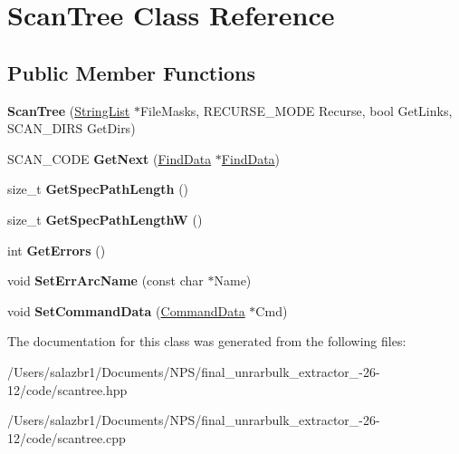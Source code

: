 \hypertarget{class_scan_tree}{\section{Scan\-Tree Class Reference}
\label{class_scan_tree}
}
\subsection*{Public Member Functions}
\begin{DoxyCompactItemize}
\item 
\hypertarget{class_scan_tree_ac0ce8c91db12e916d275bbc1b6ac73c2}{{\bfseries Scan\-Tree} (\hyperlink{class_string_list}{String\-List} $\ast$File\-Masks, R\-E\-C\-U\-R\-S\-E\-\_\-\-M\-O\-D\-E Recurse, bool Get\-Links, S\-C\-A\-N\-\_\-\-D\-I\-R\-S Get\-Dirs)}\label{class_scan_tree_ac0ce8c91db12e916d275bbc1b6ac73c2}

\item 
\hypertarget{class_scan_tree_a796c72bd82a62828c9971b239c7d1d58}{S\-C\-A\-N\-\_\-\-C\-O\-D\-E {\bfseries Get\-Next} (\hyperlink{struct_find_data}{Find\-Data} $\ast$\hyperlink{struct_find_data}{Find\-Data})}\label{class_scan_tree_a796c72bd82a62828c9971b239c7d1d58}

\item 
\hypertarget{class_scan_tree_a8095436584e40594864d446384448877}{size\-\_\-t {\bfseries Get\-Spec\-Path\-Length} ()}\label{class_scan_tree_a8095436584e40594864d446384448877}

\item 
\hypertarget{class_scan_tree_adac68a39144f5ea75933793ad7fe4a1c}{size\-\_\-t {\bfseries Get\-Spec\-Path\-Length\-W} ()}\label{class_scan_tree_adac68a39144f5ea75933793ad7fe4a1c}

\item 
\hypertarget{class_scan_tree_a306754913b59fb6133069e8719762779}{int {\bfseries Get\-Errors} ()}\label{class_scan_tree_a306754913b59fb6133069e8719762779}

\item 
\hypertarget{class_scan_tree_a5310b01db61057bac53a8443221c4dd3}{void {\bfseries Set\-Err\-Arc\-Name} (const char $\ast$Name)}\label{class_scan_tree_a5310b01db61057bac53a8443221c4dd3}

\item 
\hypertarget{class_scan_tree_a8f8dc066afc486cccf72f9f9bcfebdb6}{void {\bfseries Set\-Command\-Data} (\hyperlink{class_command_data}{Command\-Data} $\ast$Cmd)}\label{class_scan_tree_a8f8dc066afc486cccf72f9f9bcfebdb6}

\end{DoxyCompactItemize}


The documentation for this class was generated from the following files\-:\begin{DoxyCompactItemize}
\item 
/\-Users/salazbr1/\-Documents/\-N\-P\-S/final\-\_\-unrarbulk\-\_\-extractor\-\_-\/26-\/12/code/scantree.\-hpp\item 
/\-Users/salazbr1/\-Documents/\-N\-P\-S/final\-\_\-unrarbulk\-\_\-extractor\-\_-\/26-\/12/code/scantree.\-cpp\end{DoxyCompactItemize}
